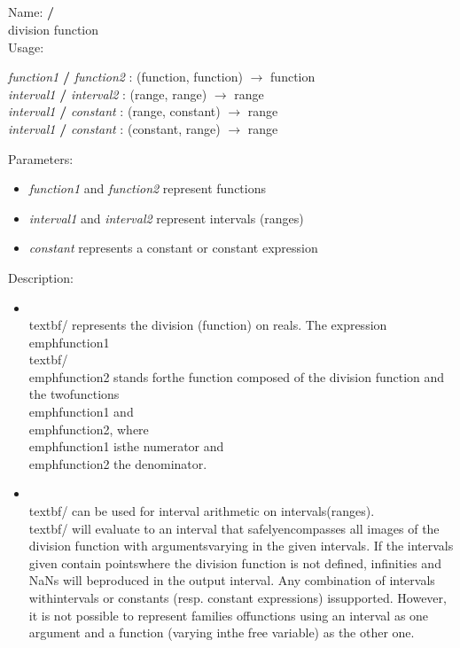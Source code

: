 \subsection{\/}
\label{labdivide}
\noindent Name: \textbf{/}\\
division function\\
\noindent Usage: 
\begin{center}
\emph{function1} \textbf{/} \emph{function2} : (\textsf{function}, \textsf{function}) $\rightarrow$ \textsf{function}\\
\emph{interval1} \textbf{/} \emph{interval2} : (\textsf{range}, \textsf{range}) $\rightarrow$ \textsf{range}\\
\emph{interval1} \textbf{/} \emph{constant} : (\textsf{range}, \textsf{constant}) $\rightarrow$ \textsf{range}\\
\emph{interval1} \textbf{/} \emph{constant} : (\textsf{constant}, \textsf{range}) $\rightarrow$ \textsf{range}\\
\end{center}
Parameters: 
\begin{itemize}
\item \emph{function1} and \emph{function2} represent functions
\item \emph{interval1} and \emph{interval2} represent intervals (ranges)
\item \emph{constant} represents a constant or constant expression
\end{itemize}
\noindent Description: \begin{itemize}

\item \\textbf{/} represents the division (function) on reals. \n   The expression \\emph{function1} \\textbf{/} \\emph{function2} stands for\n   the function composed of the division function and the two\n   functions \\emph{function1} and \\emph{function2}, where \\emph{function1} is\n   the numerator and \\emph{function2} the denominator.\n
\item \\textbf{/} can be used for interval arithmetic on intervals\n   (ranges). \\textbf{/} will evaluate to an interval that safely\n   encompasses all images of the division function with arguments\n   varying in the given intervals. If the intervals given contain points\n   where the division function is not defined, infinities and NaNs will be\n   produced in the output interval.  Any combination of intervals with\n   intervals or constants (resp. constant expressions) is\n   supported. However, it is not possible to represent families of\n   functions using an interval as one argument and a function (varying in\n   the free variable) as the other one.\n\end{itemize}
